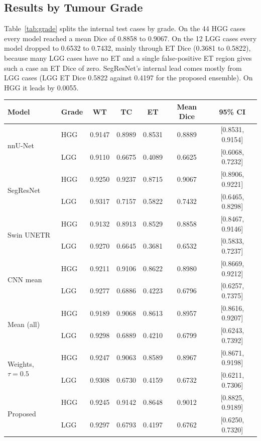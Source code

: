 \documentclass[a4paper,fleqn]{cas-sc}
\begin{document}
\subsection{Results by Tumour Grade}
\label{sec:grade}

Table~\ref{tab:grade} splits the internal test cases by grade. On the 44 HGG cases every model reached a mean Dice of 0.8858 to 0.9067. On the 12 LGG cases every model dropped to 0.6532 to 0.7432, mainly through ET Dice (0.3681 to 0.5822), because many LGG cases have no ET and a single false-positive ET region gives such a case an ET Dice of zero. SegResNet's internal lead comes mostly from LGG cases (LGG ET Dice 0.5822 against 0.4197 for the proposed ensemble). On HGG it leads by 0.0055.

\begin{heretable}
\centering
\caption{Internal test Dice by grade (44 HGG, 12 LGG cases), with the bootstrap 95\% CI of the mean Dice.}
\label{tab:grade}
\small
\begin{tabular*}{\textwidth}{@{\extracolsep{\fill}}llccccc@{}}
\toprule
Model & Grade & WT & TC & ET & Mean Dice & 95\% CI \\
\midrule
\multirow{2}{*}{nnU-Net} & HGG & 0.9147 & 0.8989 & 0.8531 & 0.8889 & [0.8531, 0.9154] \\
 & LGG & 0.9110 & 0.6675 & 0.4089 & 0.6625 & [0.6068, 0.7232] \\
\multirow{2}{*}{SegResNet} & HGG & 0.9250 & 0.9237 & 0.8715 & 0.9067 & [0.8906, 0.9221] \\
 & LGG & 0.9317 & 0.7157 & 0.5822 & 0.7432 & [0.6465, 0.8298] \\
\multirow{2}{*}{Swin UNETR} & HGG & 0.9132 & 0.8913 & 0.8529 & 0.8858 & [0.8467, 0.9146] \\
 & LGG & 0.9270 & 0.6645 & 0.3681 & 0.6532 & [0.5833, 0.7237] \\
\multirow{2}{*}{CNN mean} & HGG & 0.9211 & 0.9106 & 0.8622 & 0.8980 & [0.8669, 0.9212] \\
 & LGG & 0.9277 & 0.6886 & 0.4223 & 0.6796 & [0.6257, 0.7375] \\
\multirow{2}{*}{Mean (all)} & HGG & 0.9189 & 0.9068 & 0.8613 & 0.8957 & [0.8616, 0.9207] \\
 & LGG & 0.9298 & 0.6889 & 0.4210 & 0.6799 & [0.6243, 0.7392] \\
\multirow{2}{*}{Weights, $\tau=0.5$} & HGG & 0.9247 & 0.9063 & 0.8589 & 0.8967 & [0.8671, 0.9198] \\
 & LGG & 0.9308 & 0.6730 & 0.4159 & 0.6732 & [0.6211, 0.7306] \\
\multirow{2}{*}{Proposed} & HGG & 0.9245 & 0.9142 & 0.8648 & 0.9012 & [0.8825, 0.9189] \\
 & LGG & 0.9297 & 0.6793 & 0.4197 & 0.6762 & [0.6250, 0.7320] \\
\bottomrule
\end{tabular*}
\end{heretable}
\end{document}
